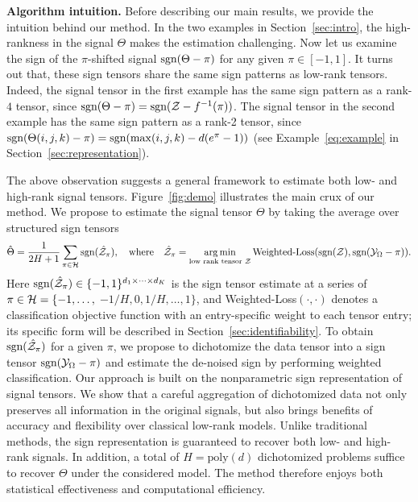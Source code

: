 \documentclass{article}
\theoremstyle{plain}
\theoremstyle{definition}
\def\sign{\textup{sgn}}
\begin{document}
{\bf Algorithm intuition.} Before describing our main results, we provide the intuition behind our method. In the two examples in Section~\ref{sec:intro}, the high-rankness in the signal $\Theta$ makes the estimation challenging. Now let us examine the sign of the $\pi$-shifted signal $\sign(\Theta-\pi)$ for any given $\pi\in[-1,1]$. It turns out that, these sign tensors share the same sign patterns as low-rank tensors. Indeed, the signal tensor in the first example has the same sign pattern as a rank-$4$ tensor, since $\sign(\Theta-\pi)=\sign(\tZ-f^{-1}(\pi))$. The signal tensor in the second example has the same sign pattern as a rank-2 tensor, since $\sign(\Theta(i,j,k)-\pi)=\sign(\max(i,j,k)-d(e^{\pi}-1))$ (see Example~\ref{eq:example} in Section~\ref{sec:representation}).

The above observation suggests a general framework to estimate both low- and high-rank signal tensors. Figure~\ref{fig:demo} illustrates the main crux of our method. We propose to estimate the signal tensor $\Theta$ by taking the average over structured sign tensors
\begin{equation}\label{eq:intuition}
\hat \Theta = {1\over 2H+1}\sum_{\pi \in \tH} \sign(\hat \tZ_\pi), \quad \text{where}\quad \hat \tZ_\pi=\argmin_{\text{low rank tensor $\tZ$}} \text{Weighted-Loss}(\sign(\tZ), \sign (\tY_\Omega-\pi)).
\end{equation}
Here $\sign(\hat \tZ_\pi)\in\{-1,1\}^{d_1\times\cdots\times d_K}$ is the sign tensor estimate at a series of $\pi\in \tH=\{\small-1,\ldots,$ $-{1/H},0, {1/H},\ldots,1\}$, and Weighted-Loss$(\cdot,\cdot)$ denotes a classification objective function with an entry-specific weight to each tensor entry; its specific form will be described in Section~\ref{sec:identifiability}. To obtain $\sign(\hat \tZ_\pi)$ for a given $\pi$, we propose to dichotomize the data tensor into a sign tensor $\sign (\tY_\Omega-\pi)$ and estimate the de-noised sign by performing weighted classification. %
Our approach is built on the nonparametric sign representation of signal tensors.
We show that a careful aggregation of dichotomized data not only preserves all information in the original signals, but also brings benefits of accuracy and flexibility over classical low-rank models. Unlike traditional methods, the sign representation is guaranteed to recover both low- and high-rank signals. In addition, a total of $H=\text{poly}(d)$ dichotomized problems suffice to recover $\Theta$ under the considered model.  The method therefore enjoys both statistical effectiveness and computational efficiency. 
\end{document}
